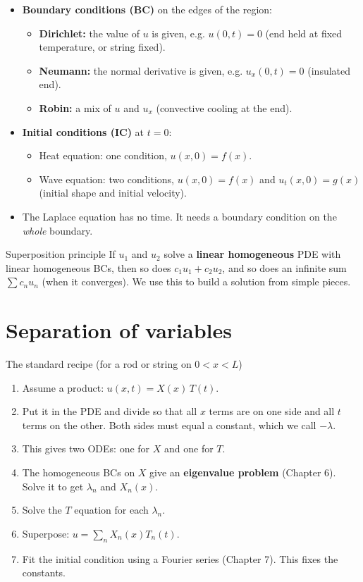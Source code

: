 \begin{itemize}
  \item \textbf{Boundary conditions (BC)} on the edges of the region:
  \begin{itemize}
    \item \textbf{Dirichlet:} the value of $u$ is given, e.g. $u(0,t)=0$ (end held at fixed temperature, or string fixed).
    \item \textbf{Neumann:} the normal derivative is given, e.g. $u_x(0,t)=0$ (insulated end).
    \item \textbf{Robin:} a mix of $u$ and $u_x$ (convective cooling at the end).
  \end{itemize}
  \item \textbf{Initial conditions (IC)} at $t=0$:
  \begin{itemize}
    \item Heat equation: one condition, $u(x,0)=f(x)$.
    \item Wave equation: two conditions, $u(x,0)=f(x)$ and $u_t(x,0)=g(x)$ (initial shape and initial velocity).
  \end{itemize}
  \item The Laplace equation has no time. It needs a boundary condition on the \emph{whole} boundary.
\end{itemize}

\begin{defbox}{Superposition principle}
If $u_1$ and $u_2$ solve a \textbf{linear homogeneous} PDE with linear homogeneous BCs, then so does $c_1u_1 + c_2u_2$, and so does an infinite sum $\sum c_nu_n$ (when it converges). We use this to build a solution from simple pieces.
\end{defbox}

\section{Separation of variables}

\begin{methodbox}{The standard recipe (for a rod or string on $0<x<L$)}
\begin{enumerate}
  \item Assume a product: $u(x,t) = X(x)\,T(t)$.
  \item Put it in the PDE and divide so that all $x$ terms are on one side and all $t$ terms on the other. Both sides must equal a constant, which we call $-\lambda$.
  \item This gives two ODEs: one for $X$ and one for $T$.
  \item The homogeneous BCs on $X$ give an \textbf{eigenvalue problem} (Chapter 6). Solve it to get $\lambda_n$ and $X_n(x)$.
  \item Solve the $T$ equation for each $\lambda_n$.
  \item Superpose: $u = \sum_n X_n(x)T_n(t)$.
  \item Fit the initial condition using a Fourier series (Chapter 7). This fixes the constants.
\end{enumerate}
\end{methodbox}

